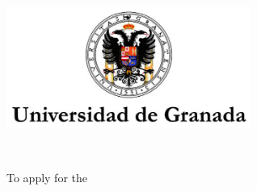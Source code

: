 \begin{titlepage}
    \begin{center}
        \large
        \vspace*{4cm}
        \includegraphics[width=8cm]{gfx/ugr_formal} \\

        \vspace{3cm}

        {\color{ugrOrange}\spacedallcaps{\myTitle}} \\ \bigskip

        \spacedlowsmallcaps{\myName}

        \vspace{2cm}
    {\textcolor{ugrGray}
        {\small To apply for the }\normalsize\\
         \\ %

        \myDepartment \\
        \myFaculty \\
        \myUni \\ \bigskip

        \vfill

        \myTime
    }
        \vfill

    \end{center}
\end{titlepage}   